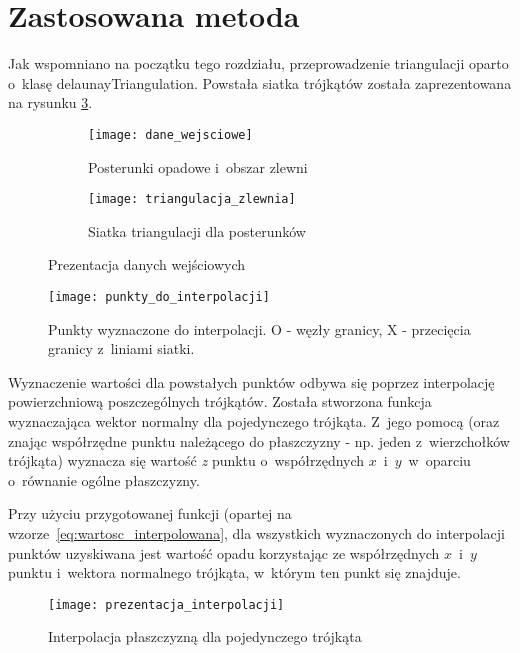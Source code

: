 \section{Zastosowana metoda}

Jak wspomniano na początku tego rozdziału, przeprowadzenie triangulacji oparto o~klasę delaunayTriangulation. Powstała siatka trójkątów została zaprezentowana na rysunku \ref{fig:triagnulacja_danych}.

\begin{figure}[ht]
	\centering
\begin{subfigure}[t]{.5\textwidth}
	\centering
	\texttt{[image: dane\_wejsciowe]}
	\caption{Posterunki opadowe i~obszar zlewni}
	\label{fig:dane_wejsciowe}
\end{subfigure}%
	\begin{subfigure}[t]{0.5\textwidth}
	\centering
	\texttt{[image: triangulacja\_zlewnia]}
	\caption{Siatka triangulacji dla posterunków}
	\label{fig:triagnulacja_danych}
\end{subfigure}	
\caption{Prezentacja danych wejściowych}
	
\end{figure}


\begin{figure}[ht]
	\centering
	\texttt{[image: punkty\_do\_interpolacji]}
	\caption{Punkty wyznaczone do interpolacji.
	O - węzły granicy, X - przecięcia granicy z~liniami siatki.}
	\label{fig:punkty_interpolacji}
\end{figure}

Wyznaczenie wartości dla powstałych punktów odbywa się poprzez interpolację powierzchniową poszczególnych trójkątów. Została stworzona funkcja wyznaczająca wektor normalny dla pojedynczego trójkąta. Z~jego pomocą (oraz znając współrzędne punktu należącego do płaszczyzny - np. jeden z~wierzchołków trójkąta) wyznacza się wartość \textit{z} punktu o~współrzędnych $x$~i~$y$~w~oparciu o~równanie ogólne płaszczyzny.

Przy użyciu przygotowanej funkcji (opartej na wzorze~\ref{eq:wartosc_interpolowana}, dla wszystkich wyznaczonych do interpolacji punktów uzyskiwana jest wartość opadu korzystając ze współrzędnych $x$~i~$y$ punktu i~wektora normalnego trójkąta, w~którym ten punkt się znajduje.

\begin{figure}[ht]
	\centering
	\texttt{[image: prezentacja\_interpolacji]}
	\caption{Interpolacja płaszczyzną dla pojedynczego trójkąta}
	\label{fig:plaszczyzna_interpolacji}
\end{figure}


